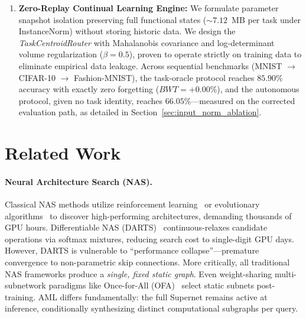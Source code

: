\documentclass[11pt, a4paper]{article}
\begin{document}
\begin{enumerate}
    \item \textbf{Zero-Replay Continual Learning Engine:} We formulate parameter snapshot isolation preserving full functional states ($\sim 7.12$~MB per task under InstanceNorm) without storing historic data. We design the \emph{TaskCentroidRouter} with Mahalanobis covariance and log-determinant volume regularization ($\beta=0.5$), proven to operate strictly on training data to eliminate empirical data leakage. Across sequential benchmarks (MNIST $\to$ CIFAR-10 $\to$ Fashion-MNIST), the task-oracle protocol reaches $85.90\%$ accuracy with exactly zero forgetting ($BWT = +0.00\%$), and the autonomous protocol, given no task identity, reaches $66.05\%$---measured on the corrected evaluation path, as detailed in Section~\ref{sec:input_norm_ablation}.
\end{enumerate}

\section{Related Work}
\label{sec:related}

\paragraph{Neural Architecture Search (NAS).}
Classical NAS methods utilize reinforcement learning~\cite{zoph2016neural} or evolutionary algorithms~\cite{real2019regularized} to discover high-performing architectures, demanding thousands of GPU hours. Differentiable NAS (DARTS)~\cite{liu2018darts} continuous-relaxes candidate operations via softmax mixtures, reducing search cost to single-digit GPU days. However, DARTS is vulnerable to ``performance collapse''---premature convergence to non-parametric skip connections. More critically, all traditional NAS frameworks produce a \emph{single, fixed static graph}. Even weight-sharing multi-subnetwork paradigms like Once-for-All (OFA)~\cite{cai2020once} select static subnets post-training. AML differs fundamentally: the full Supernet remains active at inference, conditionally synthesizing distinct computational subgraphs per query.
\end{document}
